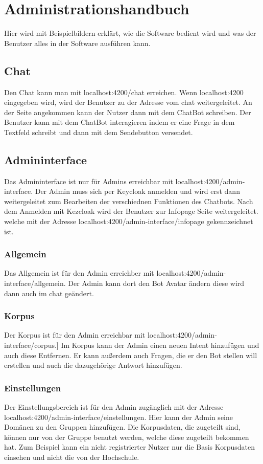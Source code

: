 \section{Administrationshandbuch}
Hier wird mit Beispielbildern erklärt, wie die Software bedient wird und was der Benutzer alles 
in der Software ausführen kann.

\subsection{Chat}
Den Chat kann man mit localhost:4200/chat erreichen. Wenn localhost:4200
eingegeben wird, wird der Benutzer zu der Adresse vom chat weitergeleitet.
An der Seite angekommen kann der Nutzer dann mit dem ChatBot schreiben. 
Der Benutzer kann mit dem ChatBot interagieren indem er eine Frage in dem Textfeld schreibt
und dann mit dem Sendebutton versendet.

\subsection{Admininterface}
Das Admininterface ist nur für Admins erreichbar mit localhost:4200/admin-interface. Der Admin muss sich per Keycloak
anmelden und wird erst dann weitergeleitet zum Bearbeiten der verschiednen Funktionen
des Chatbots.
Nach dem Anmelden mit Kezcloak wird der Benutzer zur Infopage Seite weitergeleitet.
welche mit der Adresse localhost:4200/admin-interface/infopage gekennzeichnet ist.

\subsubsection{Allgemein}
Das Allgemein ist für den Admin erreichber mit localhost:4200/admin-interface/allgemein. 
Der Admin kann dort den Bot Avatar ändern diese wird dann auch im chat geändert.

\subsubsection{Korpus}
Der Korpus ist für den Admin erreichbar mit localhost:4200/admin-interface/corpus.]
Im Korpus kann der Admin einen neuen Intent hinzufügen und auch diese Entfernen. 
Er kann außerdem auch Fragen, die er den Bot stellen will erstellen und auch die 
dazugehörige Antwort hinzufügen.

\subsubsection{Einstellungen}
Der Einstellungsbereich ist für den Admin zugänglich mit der Adresse 
localhost:4200/admin-interface/einstellungen.
Hier kann der Admin seine Domänen zu den Gruppen hinzufügen. Die Korpusdaten, die zugeteilt sind,
können nur von der Gruppe benutzt werden, welche diese zugeteilt bekommen hat. 
Zum Beispiel kann ein nicht registrierter Nutzer nur die Basis Korpusdaten einsehen und nicht die von der Hochschule.